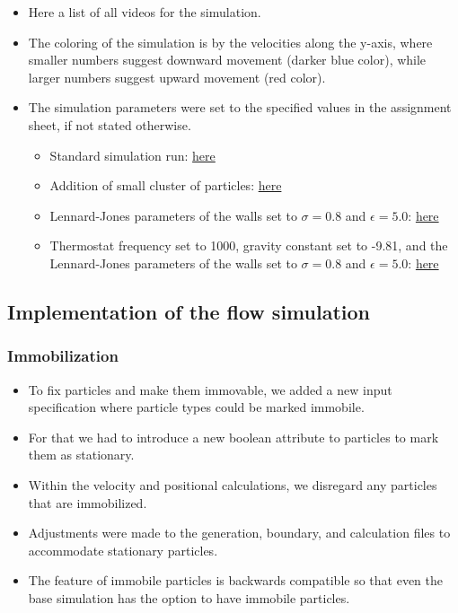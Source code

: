 \documentclass{article}
\begin{document}
    \begin{itemize}
        \item Here a list of all videos for the simulation.
        \item The coloring of the simulation is by the velocities along the y-axis, where smaller numbers suggest downward movement (darker blue color), while larger numbers suggest upward movement (red color).
        \item The simulation parameters were set to the specified values in the assignment sheet, if not stated otherwise.
        \begin{itemize}
            \item Standard simulation run: \href{https://youtu.be/-eWISjhgIgA}{here}
            \item Addition of small cluster of particles: \href{https://youtu.be/G34H3SCnpW0}{here}
            \item Lennard-Jones parameters of the walls set to $\sigma = 0.8$ and $\epsilon = 5.0$: \href{https://youtu.be/I4h6tjnJVuI}{here}
            \item Thermostat frequency set to 1000, gravity constant set to -9.81, and the Lennard-Jones parameters of the walls set to $\sigma = 0.8$ and $\epsilon = 5.0$: \href{https://youtu.be/yxNYmXJg5r0}{here}
        \end{itemize}
    \end{itemize}

\subsection{Implementation of the flow simulation}
\label{sec:nano:impl}

    \subsubsection{Immobilization}
    \label{sec:nano:impl:immob}
        \begin{itemize}
            \item To fix particles and make them immovable, we added a new input specification where particle types could be marked immobile.
            \item For that we had to introduce a new boolean attribute to particles to mark them as stationary.
            \item Within the velocity and positional calculations, we disregard any particles that are immobilized.
            \item Adjustments were made to the generation, boundary, and calculation files to accommodate stationary particles.
            \item The feature of immobile particles is backwards compatible so that even the base simulation has the option to have immobile particles.
        \end{itemize}
\end{document}
